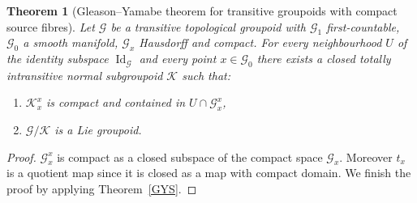 \documentclass[pdftex]{sigma}
\newtheorem{tw}{Theorem}[section]
\begin{document}
\begin{tw}[Gleason--Yamabe theorem for transitive groupoids with compact source fibres] Let $\mathcal{G}$ be a transitive topological groupoid with $\mathcal{G}_1$ first-countable, $\mathcal{G}_0$ a smooth manifold, $\mathcal{G}_x$ Hausdorff and compact. For every neighbourhood $U$ of the identity subspace $\operatorname{Id}_{\mathcal{G}}$ and every point $x\in\mathcal{G}_0$ there exists a closed totally intransitive normal subgroupoid $\mathcal{K}$ such that:
\begin{enumerate}\itemsep=0pt
\item[$1)$] $\mathcal{K}^x_x$ is compact and contained in $U\cap\mathcal{G}^x_x$,
\item[$2)$] $\mathcal{G}\slash\mathcal{K}$ is a Lie groupoid.
\end{enumerate}
\end{tw}
\begin{proof} $\mathcal{G}^x_x$ is compact as a closed subspace of the compact space $\mathcal{G}_x$. Moreover $t_x$ is a quotient map since it is closed as a map with compact domain. We finish the proof by applying Theorem~\ref{GYS}.
\end{proof}
\end{document}
